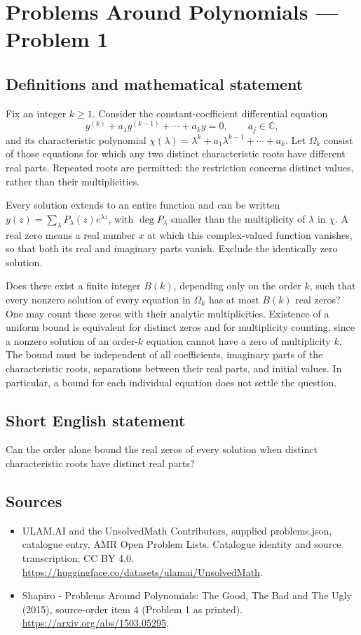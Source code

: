\documentclass[11pt,a4paper]{article}
\begin{document}
\section*{Problems Around Polynomials — Problem 1}\label{statement}

\subsection{Definitions and mathematical statement}
Fix an integer $k\geq1$. Consider the constant-coefficient differential equation
\[
 y^{(k)}+a_1y^{(k-1)}+\cdots+a_ky=0,\qquad a_j\in\mathbb C,
\]
and its characteristic polynomial
$\chi(\lambda)=\lambda^k+a_1\lambda^{k-1}+\cdots+a_k$.
Let $\Omega_k$ consist of those equations for which any two distinct
characteristic roots have different real parts. Repeated roots are permitted:
the restriction concerns distinct values, rather than their multiplicities.

Every solution extends to an entire function and can be written
$y(z)=\sum_{\lambda}P_\lambda(z)e^{\lambda z}$, with
$\deg P_\lambda$ smaller than the multiplicity of $\lambda$ in $\chi$.
A real zero means a real number $x$ at which this complex-valued function
vanishes, so that both its real and imaginary parts vanish. Exclude the
identically zero solution.

Does there exist a finite integer $B(k)$, depending only on the order $k$,
such that every nonzero solution of every equation in $\Omega_k$ has at
most $B(k)$ real zeros? One may count these zeros with their analytic
multiplicities. Existence of a uniform bound is equivalent for distinct
zeros and for multiplicity counting, since a nonzero solution of an
order-$k$ equation cannot have a zero of multiplicity $k$.
The bound must be independent of all coefficients, imaginary parts of
the characteristic roots, separations between their real parts, and
initial values. In particular, a bound for each individual equation
does not settle the question.
\subsection{Short English statement}
Can the order alone bound the real zeros of every solution when distinct characteristic roots have distinct real parts?
\subsection{Sources}
\begin{itemize}
\item[S1] ULAM.AI and the UnsolvedMath Contributors, supplied problems.json, catalogue entry, AMR Open Problem Lists. Catalogue identity and source transcription; CC BY 4.0.
\url{https://huggingface.co/datasets/ulamai/UnsolvedMath}.
\item[S2] Shapiro - Problems Around Polynomials: The Good, The Bad and The Ugly (2015), source-order item 4 (Problem 1 as printed). 
\url{https://arxiv.org/abs/1503.05295}.
\end{itemize}
\end{document}
